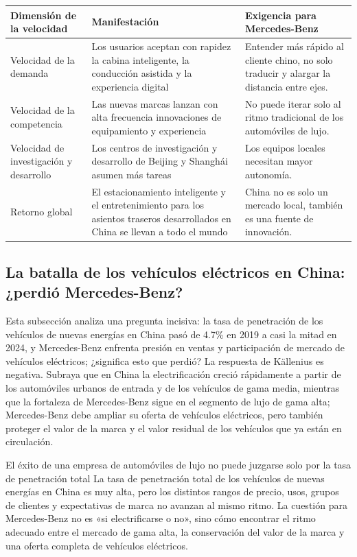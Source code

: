\noindent\begin{tabularx}{\textwidth}{p{}p{}X}
\toprule
Dimensión de la velocidad & Manifestación & Exigencia para Mercedes-Benz \\
\midrule
Velocidad de la demanda & Los usuarios aceptan con rapidez la cabina inteligente, la conducción asistida y la experiencia digital & Entender más rápido al cliente chino, no solo traducir y alargar la distancia entre ejes. \\
Velocidad de la competencia & Las nuevas marcas lanzan con alta frecuencia innovaciones de equipamiento y experiencia & No puede iterar solo al ritmo tradicional de los automóviles de lujo. \\
Velocidad de investigación y desarrollo & Los centros de investigación y desarrollo de Beijing y Shanghái asumen más tareas & Los equipos locales necesitan mayor autonomía. \\
Retorno global & El estacionamiento inteligente y el entretenimiento para los asientos traseros desarrollados en China se llevan a todo el mundo & China no es solo un mercado local, también es una fuente de innovación. \\
\bottomrule
\end{tabularx}

\subsection{La batalla de los vehículos eléctricos en China: ¿perdió Mercedes-Benz?}

Esta subsección analiza una pregunta incisiva: la tasa de penetración de los vehículos de nuevas energías en China pasó de 4.7\% en 2019 a casi la mitad en 2024, y Mercedes-Benz enfrenta presión en ventas y participación de mercado de vehículos eléctricos; ¿significa esto que perdió? La respuesta de Källenius es negativa. Subraya que en China la electrificación creció rápidamente a partir de los automóviles urbanos de entrada y de los vehículos de gama media, mientras que la fortaleza de Mercedes-Benz sigue en el segmento de lujo de gama alta; Mercedes-Benz debe ampliar su oferta de vehículos eléctricos, pero también proteger el valor de la marca y el valor residual de los vehículos que ya están en circulación.

\begin{warningbox}{El éxito de una empresa de automóviles de lujo no puede juzgarse solo por la tasa de penetración total}
La tasa de penetración total de los vehículos de nuevas energías en China es muy alta, pero los distintos rangos de precio, usos, grupos de clientes y expectativas de marca no avanzan al mismo ritmo. La cuestión para Mercedes-Benz no es «si electrificarse o no», sino cómo encontrar el ritmo adecuado entre el mercado de gama alta, la conservación del valor de la marca y una oferta completa de vehículos eléctricos.
\end{warningbox}


